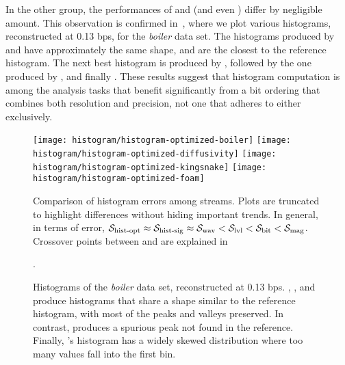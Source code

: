 In the other group, the performances of \swav and \shsg (and even \shop) differ by negligible
amount. This observation is confirmed in~, where we plot various
histograms, reconstructed at 0.13 bps, for the \emph{boiler} data set. The histograms produced by
\swav and \shsg have approximately the same shape, and are the closest to the reference histogram.
The next best histogram is produced by \slvl, followed by the one produced by \sbit, and finally
\smag. These results suggest that histogram computation is among the analysis tasks that benefit
significantly from a bit ordering that combines both resolution and precision, not one that adheres
to either exclusively.

\begin{figure*}[h]
	\centering
	{\texttt{[image: histogram/histogram-optimized-boiler]}}
	{\texttt{[image: histogram/histogram-optimized-diffusivity]}}
	{\texttt{[image: histogram/histogram-optimized-kingsnake]}}
	{\texttt{[image: histogram/histogram-optimized-foam]}}
	\caption{Comparison of histogram errors among streams. Plots are truncated to highlight
	differences without hiding important trends. In general, in terms of error, $\shop \approx
	\shsg \approx \swav < \slvl < \sbit < \smag$. Crossover points between \sbit and \slvl are
	explained in~}.
	\label{fig:histogram-stream-comparison}
\vspace{1em}

	\centering
	\caption{Histograms of the \emph{boiler} data set, reconstructed at 0.13 bps. \slvl, \swav, and
	\shsg produce histograms that share a shape similar to the reference histogram, with most of the
	peaks and valleys preserved. In contrast, \sbit produces a spurious peak not found in the
	reference. Finally, \smag's histogram has a widely skewed distribution where too many values fall
	into the first bin.}
	\label{fig:histograms-boiler}
\end{figure*}

